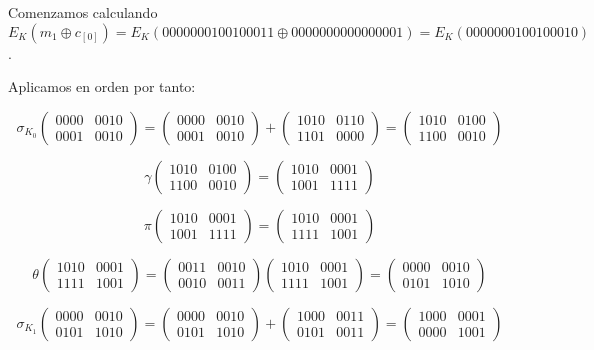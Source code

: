 \documentclass[a4paper]{article}
\begin{document}
Comenzamos calculando $E_K (m_1 \oplus c_{[0]} ) = E_K ( 0000 0001 0010 0011 \oplus 0000 0000 0000 0001) = E_K(0000 0001 0010 0010)$.

Aplicamos en orden por tanto:

$$\sigma_{K_0} \begin{pmatrix} 0000 & 0010 \\ 0001 & 0010 \end{pmatrix} = \begin{pmatrix} 0000 & 0010 \\ 0001 & 0010 \end{pmatrix} + \begin{pmatrix} 1010 & 0110 \\ 1101 & 0000 \end{pmatrix} = \begin{pmatrix} 1010 & 0100 \\ 1100 & 0010 \end{pmatrix}$$

$$\gamma \begin{pmatrix} 1010 & 0100 \\ 1100 & 0010 \end{pmatrix} = \begin{pmatrix} 1010 & 0001 \\ 1001 & 1111 \end{pmatrix}$$

$$\pi \begin{pmatrix} 1010 & 0001 \\ 1001 & 1111 \end{pmatrix} = \begin{pmatrix} 1010 & 0001 \\ 1111 & 1001 \end{pmatrix}$$

$$\theta \begin{pmatrix} 1010 & 0001 \\ 1111 & 1001 \end{pmatrix} = \begin{pmatrix} 0011 & 0010 \\ 0010 & 0011 \end{pmatrix}\begin{pmatrix} 1010 & 0001 \\ 1111 & 1001 \end{pmatrix} = \begin{pmatrix} 0000 & 0010 \\ 0101 & 1010 \end{pmatrix}$$

$$\sigma_{K_1} \begin{pmatrix} 0000 & 0010 \\ 0101 & 1010 \end{pmatrix} = \begin{pmatrix} 0000 & 0010 \\ 0101 & 1010 \end{pmatrix} + \begin{pmatrix} 1000 & 0011 \\ 0101 & 0011 \end{pmatrix} = \begin{pmatrix} 1000 & 0001 \\ 0000 & 1001 \end{pmatrix}$$
\end{document}
